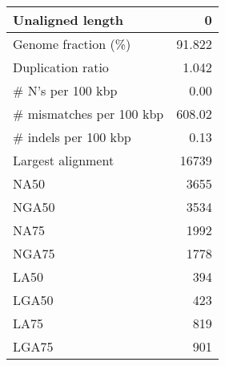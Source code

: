 \documentclass[12pt,a4paper]{article}
\begin{document}
\begin{table}[ht]
\begin{center}
\begin{tabular}{|l*{1}{|r}|}
Unaligned length & 0 \\ \hline
Genome fraction (\%) & 91.822 \\ \hline
Duplication ratio & 1.042 \\ \hline
\# N's per 100 kbp & 0.00 \\ \hline
\# mismatches per 100 kbp & 608.02 \\ \hline
\# indels per 100 kbp & 0.13 \\ \hline
Largest alignment & 16739 \\ \hline
NA50 & 3655 \\ \hline
NGA50 & 3534 \\ \hline
NA75 & 1992 \\ \hline
NGA75 & 1778 \\ \hline
LA50 & 394 \\ \hline
LGA50 & 423 \\ \hline
LA75 & 819 \\ \hline
LGA75 & 901 \\ \hline
\end{tabular}
\end{center}
\end{table}
\end{document}
